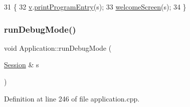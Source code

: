 \begin{DoxyCode}
31 \{  
32     \hyperlink{class_application_a96cff2295a95d7e6de06638bb7e61243}{v}.\hyperlink{class_visualize_a29f27ff8c5e59163eea2be42ff372405}{printProgramEntry}(s);
33     \hyperlink{class_application_abf73a60a6a2e4b83a675de777273d12c}{welcomeScreen}(s);
34 \}
\end{DoxyCode}
\mbox{\label{class_application_adb639e3593f8f6f4dcb3d89d690eb538}} 
\subsubsection{\texorpdfstring{run\+Debug\+Mode()}{runDebugMode()}}
{\footnotesize\ttfamily void Application\+::run\+Debug\+Mode (\begin{DoxyParamCaption}\item[{\hyperlink{struct_session}{Session} \&}]{s }\end{DoxyParamCaption})}



Definition at line 246 of file application.\+cpp.


